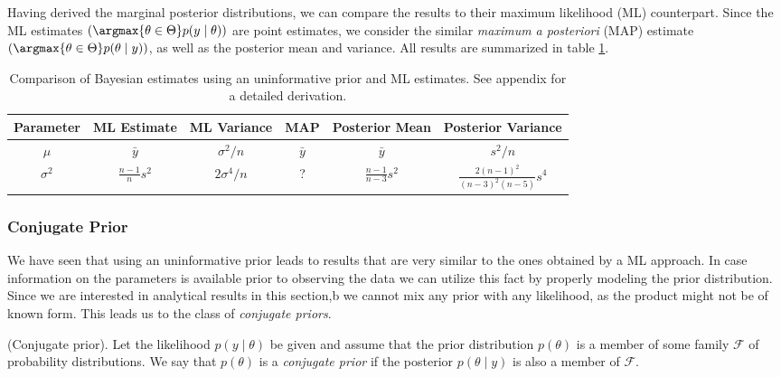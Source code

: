 Having derived the marginal posterior distributions, we can compare the results to their maximum likelihood (ML) counterpart.
Since the ML estimates $\left(\argmax{\theta \in \Theta}p(y \mid \theta)\right)$ are point estimates, we consider the similar \emph{maximum a posteriori} (MAP) estimate $\left(\argmax{\theta \in \Theta} p(\theta \mid y)\right)$, as well as the posterior mean and variance. All results are summarized in table \ref{table:comp_uniform_bay_ml}.

\begin{table}[ht]
\centering
\def\arraystretch{1.3}
{\small
 \begin{tabular}{c | c c c c c}
 Parameter & ML Estimate & ML Variance & MAP & Posterior Mean & Posterior Variance\\[0.5ex]
 \hline
 $\mu$ & $\bar{y}$ & $\sigma^2/n$ & $\bar{y}$ & $\bar{y}$ & $s^2 / n$\\
 $\sigma^2$ & $\frac{n-1}{n} s^2$ & $2 \sigma^4 /n$ & ? & $\frac{n-1}{n-3} s^2$ & $\frac{2 (n-1)^2}{(n-3)^2 (n-5)} s^4$\\
 \end{tabular}
 }
\caption{\small {Comparison of Bayesian estimates using an uninformative prior and ML estimates. See appendix for a detailed derivation.}}
\label{table:comp_uniform_bay_ml}
\end{table}


\subsubsection*{Conjugate Prior}
We have seen that using an uninformative prior leads to results that are very similar to the ones obtained by a ML approach.
In case information on the parameters is available prior to observing the data we can utilize this fact by properly modeling the prior distribution.
Since we are interested in analytical results in this section,b we cannot mix any prior with any likelihood, as the product might not be of known form.
This leads us to the class of \emph{conjugate priors}.

\begin{definition}{(Conjugate prior).}
Let the likelihood $p(y \mid \theta)$ be given and assume that the prior distribution $p(\theta)$ is a member of some family $\mathcal{F}$ of probability distributions.
We say that $p(\theta)$ is a \emph{conjugate prior} if the posterior $p(\theta \mid y)$ is also a member of $\mathcal{F}$.
\end{definition}

